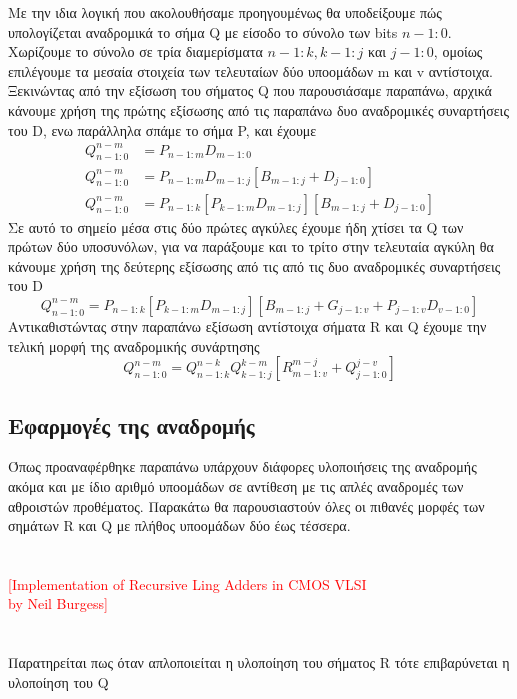 Με την ιδια λογική που ακολουθήσαμε προηγουμένως θα υποδείξουμε πώς υπολογίζεται 
αναδρομικά το σήμα Q με είσοδο το σύνολο των bits $n-1:0$.
Χωρίζουμε το σύνολο σε τρία διαμερίσματα $n-1:k , k-1:j$ και $j-1:0$, ομοίως επιλέγουμε
τα μεσαία στοιχεία των τελευταίων δύο υποομάδων m και v αντίστοιχα. Ξεκινώντας από την
εξίσωση του σήματος Q που παρουσιάσαμε παραπάνω, αρχικά κάνουμε χρήση της 
πρώτης εξίσωσης από τις παραπάνω δυο αναδρομικές συναρτήσεις του D, ενω παράλληλα
σπάμε το σήμα P, και έχουμε
\begin{equation*}
\begin{split}
    Q^{n-m}_{n-1:0} &= P_{n-1:m}D_{m-1:0}\\
    Q^{n-m}_{n-1:0} &= P_{n-1:m}D_{m-1:j}[B_{m-1:j}+D_{j-1:0}] \\
    Q^{n-m}_{n-1:0} &= P_{n-1:k}[P_{k-1:m}D_{m-1:j}][B_{m-1:j}+D_{j-1:0}]
\end{split}
\end{equation*}
Σε αυτό το σημείο μέσα στις δύο πρώτες αγκύλες έχουμε ήδη χτίσει τα Q
των πρώτων δύο υποσυνόλων, για να παράξουμε και το τρίτο στην τελευταία αγκύλη
θα κάνουμε χρήση της δεύτερης εξίσωσης από τις από τις δυο αναδρομικές συναρτήσεις του D
\begin{equation*}
    Q^{n-m}_{n-1:0} = P_{n-1:k}[P_{k-1:m}D_{m-1:j}][B_{m-1:j}+G_{j-1:v}+P_{j-1:v}D_{v-1:0}]
\end{equation*}
Αντικαθιστώντας στην παραπάνω εξίσωση αντίστοιχα σήματα R και Q έχουμε την τελική 
μορφή της αναδρομικής συνάρτησης 
\begin{equation}
    Q^{n-m}_{n-1:0} = Q^{n-k}_{n-1:k}Q^{k-m}_{k-1:j}[R^{m-j}_{m-1:v}+Q^{j-v}_{j-1:0}]
\end{equation}







\subsection{Εφαρμογές της αναδρομής}
Όπως προαναφέρθηκε παραπάνω υπάρχουν διάφορες υλοποιήσεις της αναδρομής ακόμα και με 
ίδιο αριθμό υποομάδων \cite{neil_burgess} σε αντίθεση με τις απλές αναδρομές των αθροιστών προθέματος.
Παρακάτω θα παρουσιαστούν όλες οι πιθανές μορφές των σημάτων R και Q με πλήθος υποομάδων
δύο έως τέσσερα.
\\\\\\
\textcolor{red}{[Implementation of Recursive Ling Adders in CMOS VLSI \\by Neil Burgess]}
\\\\\\
Παρατηρείται πως όταν απλοποιείται η υλοποίηση του σήματος R τότε επιβαρύνεται η υλοποίηση του Q




